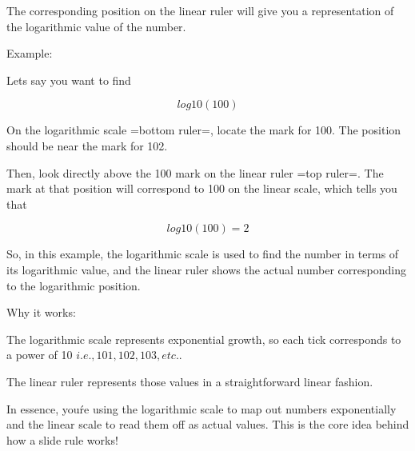 \documentclass[10pt,twocolumn]{article}
\begin{document}
The corresponding position on the linear ruler will give you a representation of the logarithmic value of the number.

Example:

Lets say you want to find 

\[ 
log10(100)
\]

On the logarithmic scale =bottom ruler=, locate the mark for 100. The position should be near the mark for 102.

Then, look directly above the 100 mark on the linear ruler =top ruler=. The mark at that position will correspond to 100 on the linear scale, which tells you that 

\[
log10(100) = 2
\]

So, in this example, the logarithmic scale is used to find the number in terms of its logarithmic value, and the linear ruler shows the actual number corresponding to the logarithmic position.

Why it works:

The logarithmic scale represents exponential growth, so each tick corresponds to a power of 10 \( i.e., 101,102,103, etc. \).

The linear ruler represents those values in a straightforward linear fashion.

In essence, you\'re using the logarithmic scale to map out numbers exponentially and the linear scale to read them off as actual values. This is the core idea behind how a slide rule works!
\end{document}
